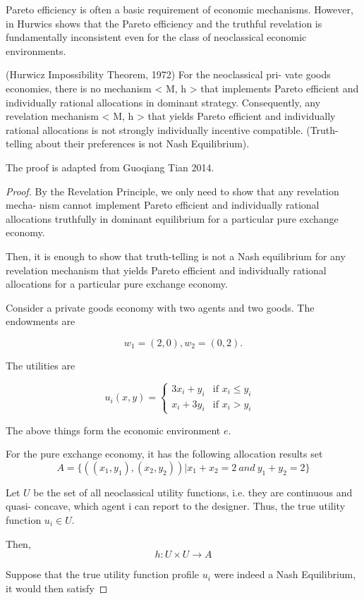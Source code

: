 Pareto efficiency is often a basic requirement of economic
mechanisms. However, in \parencite{Hurwicz1972}
Hurwics  shows that  the Pareto efficiency and the truthful revelation is
fundamentally inconsistent even for the class of neoclassical economic
environments.
\begin{thm}
(Hurwicz Impossibility Theorem, 1972) For the neoclassical pri-
vate goods economies, there is no mechanism < M, h > that implements Pareto efficient
and individually rational allocations in dominant strategy. Consequently, any revelation
mechanism < M, h > that yields Pareto efficient and individually rational allocations is
not strongly individually incentive compatible. (Truth-telling about their preferences is not
Nash Equilibrium).
\end{thm}
The proof is adapted from Guoqiang Tian 2014.
\begin{proof}

By the Revelation Principle, we only need to show that any revelation mecha-
nism cannot implement Pareto efficient and individually rational allocations truthfully
in dominant equilibrium for a particular pure exchange economy.

Then, it is enough
to show that truth-telling is not a Nash equilibrium for any revelation mechanism that
yields Pareto efficient and individually rational allocations for a particular pure exchange
economy.

Consider a private goods economy with two agents and  two goods. The
endowments are 

$$w_1=(2,0), w_2=(0,2).$$

The utilities are

$$ u_i(x,y) = \begin{cases}
3x_i + y_i & \text{if $x_i\leq y_i$ } \\
x_i + 3y_i & \text{if $x_i>y_i$ }
\end{cases}$$

The above things form the economic environment $e$.

For the pure exchange economy, it has the following
allocation results set 
$$ A =\{( (x_1,y_1), (x_2,y_2))| x_1+x_2 = 2 \ and\ y_1+y_2=2 \}$$

Let $U$ be the set of all neoclassical utility functions, i.e. they are continuous and quasi-
concave, which agent i can report to the designer. Thus, the true utility function
$u_i \in U$.

Then, 
$$ h: U\times U \rightarrow A $$

Suppose that  the true utility function profile
$u_i$ were indeed a Nash Equilibrium, it would then  satisfy


\end{proof}
